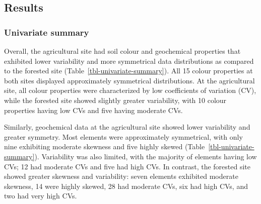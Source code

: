 \documentclass[
  number]{elsarticle}
\begin{document}
\subsection{Results}\label{results}

\subsubsection{Univariate summary}\label{univariate-summary}

Overall, the agricultural site had soil colour and geochemical
properties that exhibited lower variability and more symmetrical data
distributions as compared to the forested site
(Table~\ref{tbl-univariate-summary}). All 15 colour properties at both
sites displayed approximately symmetrical distributions. At the
agricultural site, all colour properties were characterized by low
coefficients of variation (CV), while the forested site showed slightly
greater variability, with 10 colour properties having low CVs and five
having moderate CVs.

Similarly, geochemical data at the agricultural site showed lower
variability and greater symmetry. Most elements were approximately
symmetrical, with only nine exhibiting moderate skewness and five highly
skewed (Table~\ref{tbl-univariate-summary}). Variability was also
limited, with the majority of elements having low CVs; 12 had moderate
CVs and five had high CVs. In contrast, the forested site showed greater
skewness and variability: seven elements exhibited moderate skewness, 14
were highly skewed, 28 had moderate CVs, six had high CVs, and two had
very high CVs.
\end{document}
